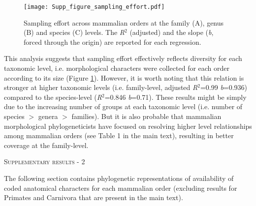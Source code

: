 \documentclass[12pt,letterpaper]{article}
\renewcommand{\section}[1]{%
\bigskip
\begin{center}
\begin{Large}
\normalfont\scshape #1
\medskip
\end{Large}
\end{center}}
\begin{document}
\begin{figure}[!htbp]
\centering
    \texttt{[image: Supp\_figure\_sampling\_effort.pdf]}
\caption{Sampling effort across mammalian orders at the family (A), genus (B) and species (C) levels. The \textit{R$^2$} (adjusted) and the slope (\textit{b}, forced through the origin) are reported for each regression.}
\label{Supp_Figure_sampling}
\end{figure}

This analysis suggests that sampling effort effectively reflects diversity for each taxonomic level, i.e. morphological characters were collected for each order according to its size (Figure \ref{Supp_Figure_sampling}).
However, it is worth noting that this relation is stronger at higher taxonomic levels (i.e. family-level, adjusted \textit{R$^2$}=0.99 \textit{b}=0.936) compared to the species-level (\textit{R$^2$}=0.846 \textit{b}=0.71).
These results might be simply due to the increasing number of groups at each taxonomic level (i.e. number of species $>$ genera $>$ families).
But it is also probable that mammalian morphological phylogeneticists have focused on resolving higher level relationships among mammalian orders (see Table 1 in the main text), resulting in better coverage at the family-level.




\newpage

\section{Supplementary results - 2}
The following section contains phylogenetic representations of availability of coded anatomical characters for each mammalian order (excluding results for Primates and Carnivora that are present in the main text).
\end{document}
